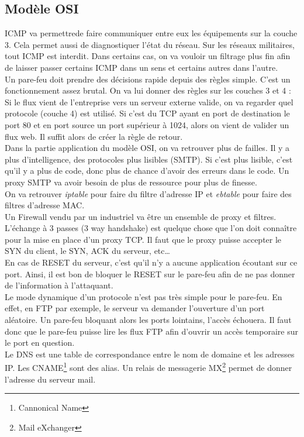 \subsection{Modèle OSI}
ICMP va permettrede faire communiquer entre eux les équipements sur la couche 3. Cela permet aussi de diagnostiquer l'état du réseau. Sur les réseaux militaires, tout ICMP est interdit. Dans certains cas, on va vouloir un filtrage plus fin afin de laisser passer certains ICMP dans un sens et certains autres dans l'autre.\\
Un pare-feu doit prendre des décisions rapide depuis des règles simple. C'est un fonctionnement assez brutal. On va lui donner des règles sur les couches 3 et 4 :\\
Si le flux vient de l'entreprise vers un serveur externe valide, on va regarder quel protocole (couche 4) est utilisé. Si c'est du TCP ayant en port de destination le port 80 et en port source un port supérieur à 1024, alors on vient de valider un flux web. Il suffit alors de créer la règle de retour.\\
Dans la partie application du modèle OSI, on va retrouver plus de failles. Il y a plus d'intelligence, des protocoles plus lisibles (SMTP). Si c'est plus lisible, c'est qu'il y a plus de code, donc plus de chance d'avoir des erreurs dans le code. Un proxy SMTP va avoir besoin de plus de ressource pour plus de finesse.\\
On va retrouver \textit{iptable} pour faire du filtre d'adresse IP et \textit{ebtable} pour faire des filtres d'adresse MAC.\\
Un Firewall vendu par un industriel va être un ensemble de proxy et filtres.\\
L'échange à 3 passes (3 way handshake) est quelque chose que l'on doit connaître pour la mise en place d'un proxy TCP. Il faut que le proxy puisse accepter le SYN du client, le SYN, ACK du serveur, etc\ldots\\
En cas de RESET du serveur, c'est qu'il n'y a aucune application écoutant sur ce port. Ainsi, il est bon de bloquer le RESET sur le pare-feu afin de ne pas donner de l'information à l'attaquant.\\
Le mode dynamique d'un protocole n'est pas très simple pour le pare-feu. En effet, en FTP par exemple, le serveur va demander l'ouverture d'un port aléatoire. Un pare-feu bloquant alors les ports lointains, l'accès échouera. Il faut donc que le pare-feu puisse lire les flux FTP afin d'ouvrir un accès temporaire sur le port en question.\\
Le DNS est une table de correspondance entre le nom de domaine et les adresses IP. Les CNAME\footnote{Cannonical Name} sont des alias. Un relais de messagerie MX\footnote{Mail eXchanger} permet de donner l'adresse du serveur mail.\\
